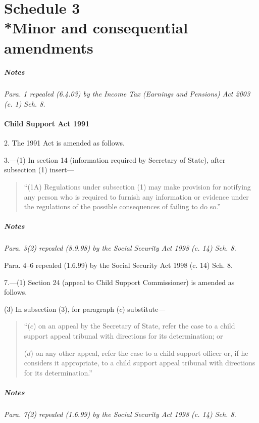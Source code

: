 \documentclass[a4paper]{article}
\newcommand{\parthead}{}
\newcommand\amendment[1]{\subsubsection*{Notes}{\itshape\frenchspacing\footnotesize #1 \par}}
\begin{document}
\part[Schedule 3 --- Minor and consequential amendments]{Schedule 3\\*Minor and consequential amendments}

\renewcommand\parthead{--- Schedule 3}

\amendment{
Para. 1 repealed (6.4.03) by the Income Tax (Earnings and Pensions) Act 2003 (c. 1) Sch. 8.
}

\subsection*{Child Support Act 1991}

2. The 1991 Act is amended as follows.

\medskip

3.---(1) In section 14 (information required by Secretary of State), after subsection (1) insert—
\begin{quotation}
“(1A) Regulations under subsection (1) may make provision for notifying any person who is required to furnish any information or evidence under the regulations of the possible consequences of failing to do so.”
\end{quotation}

\amendment{
Para. 3(2) repealed (8.9.98) by the Social Security Act 1998 (c. 14) Sch. 8.

\medskip

Para. 4--6 repealed (1.6.99) by the Social Security Act 1998 (c. 14) Sch. 8.
}

\medskip

7.---(1) Section 24 (appeal to Child Support Commissioner) is amended as follows.

(3) In subsection (3), for paragraph ($c$) substitute—
\begin{quotation}
“($c$) on an appeal by the Secretary of State, refer the case to a child support appeal tribunal with directions for its determination; or

($d$) on any other appeal, refer the case to a child support officer or, if he considers it appropriate, to a child support appeal tribunal with directions for its determination.”
\end{quotation}

\amendment{
Para. 7(2) repealed (1.6.99) by the Social Security Act 1998 (c. 14) Sch. 8.
}

\medskip
\end{document}

